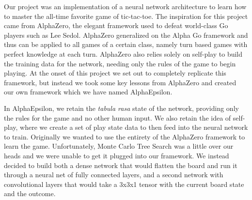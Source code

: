 

Our project was an implementation of a neural network architecture to learn how to master the all-time favorite game of tic-tac-toe.
The inspiration for this project came from AlphaZero, the elegant framework used to defeat world-class Go players such as Lee Sedol.
AlphaZero generalized on the Alpha Go framework and thus can be applied to all games of a certain class, namely turn based games with perfect knowledge at each turn.
AlphaZero also relies solely on self-play to build the training data for the network, needing only the rules of the game to begin playing.
At the onset of this project we set out to completely replicate this framework, but instead we took some key lessons from AlphaZero and created our own framework which we have named AlphaEpsilon.

In AlphaEpsilon, we retain the \textit{tabula rasa} state of the network, providing only the rules for the game and no other human input.
We also retain the idea of self-play, where we create a set of play state data to then feed into the neural network to train.
Originally we wanted to use the entirety of the AlphaZero framework to learn the game.
Unfortunately, Monte Carlo Tree Search was a little over our heads and we were unable to get it plugged into our framework.
We instead decided to build both a dense network that would flatten the board and run it through a neural net of fully connected layers, and a second network with convolutional layers that would take a 3x3x1 tensor with the current board state and the outcome.
